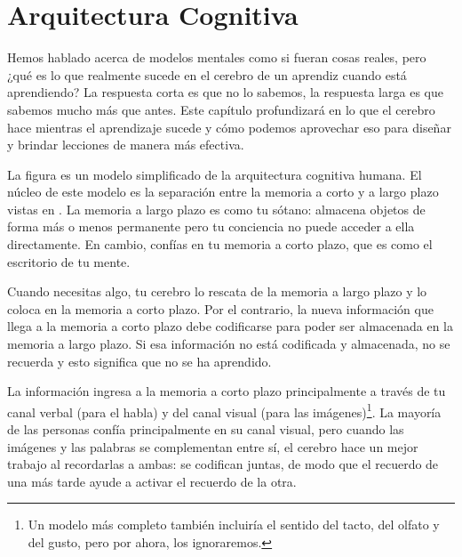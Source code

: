 \chapter{Arquitectura Cognitiva}\label{s:architecture}

Hemos hablado acerca de modelos mentales como si fueran cosas reales, 
pero ¿qué es lo que realmente sucede en el cerebro de un aprendiz cuando está aprendiendo? 
La respuesta corta es que no lo sabemos, la respuesta larga es que sabemos mucho más que antes.
Este capítulo profundizará en lo que el cerebro hace mientras el aprendizaje sucede 
y cómo podemos aprovechar eso para diseñar y brindar lecciones de manera más efectiva.



La figura  es un modelo simplificado de la arquitectura cognitiva humana.
El núcleo de este modelo es la separación entre la memoria a corto y a largo plazo vistas en .
La memoria a largo plazo es como tu sótano:
almacena objetos de forma más o menos permanente 
pero tu conciencia no puede acceder a ella directamente. 
En cambio, 
confías en tu memoria a corto plazo,
que es como el escritorio de tu mente.

Cuando necesitas algo, 
tu cerebro lo rescata de la memoria a largo plazo  
y lo coloca en la memoria a corto plazo. 
Por el contrario, la nueva información que llega a la memoria a corto plazo 
debe codificarse para poder ser almacenada en la memoria a largo plazo.
Si esa información no está codificada y almacenada, no se recuerda y esto significa que  
no se ha aprendido.

La información ingresa a la memoria a corto plazo principalmente 
a través de tu canal verbal (para el habla)
y del canal visual
(para las imágenes)\footnote{
  Un modelo más completo
  también incluiría el sentido del tacto, del olfato y del gusto,
  pero por ahora, los ignoraremos.}.
La mayoría de las personas confía principalmente en su canal visual, 
pero cuando las imágenes y las palabras se complementan entre sí,
el cerebro hace un mejor trabajo al recordarlas a ambas: 
se codifican juntas,
de modo que el recuerdo de una más tarde ayude a activar el recuerdo de la otra.

